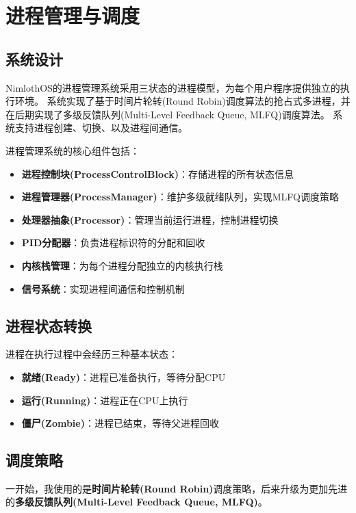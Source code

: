 \chapter{进程管理与调度}

\section{系统设计}

NimlothOS的进程管理系统采用三状态的进程模型，为每个用户程序提供独立的执行环境。
系统实现了基于时间片轮转(Round Robin)调度算法的抢占式多进程，并在后期实现了多级反馈队列(Multi-Level Feedback Queue, MLFQ)调度算法。
系统支持进程创建、切换、以及进程间通信。

进程管理系统的核心组件包括：

\begin{itemize}
    \item \textbf{进程控制块(ProcessControlBlock)}：存储进程的所有状态信息
    \item \textbf{进程管理器(ProcessManager)}：维护多级就绪队列，实现MLFQ调度策略
    \item \textbf{处理器抽象(Processor)}：管理当前运行进程，控制进程切换
    \item \textbf{PID分配器}：负责进程标识符的分配和回收
    \item \textbf{内核栈管理}：为每个进程分配独立的内核执行栈
    \item \textbf{信号系统}：实现进程间通信和控制机制
\end{itemize}

\section{进程状态转换}

进程在执行过程中会经历三种基本状态：

\begin{itemize}
    \item \textbf{就绪(Ready)}：进程已准备执行，等待分配CPU
    \item \textbf{运行(Running)}：进程正在CPU上执行
    \item \textbf{僵尸(Zombie)}：进程已结束，等待父进程回收
\end{itemize}

\section{调度策略}

一开始，我使用的是\textbf{时间片轮转(Round Robin)}调度策略，后来升级为更加先进的\textbf{多级反馈队列(Multi-Level Feedback Queue, MLFQ)}。

